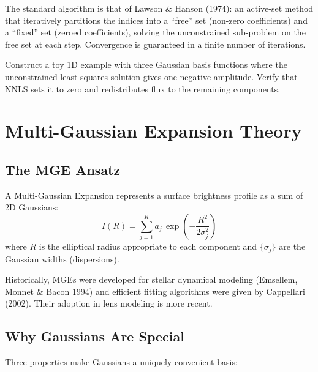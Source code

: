 \documentclass[11pt, letterpaper]{article}
\begin{document}
The standard algorithm is that of Lawson \& Hanson (1974): an active-set
method that iteratively partitions the indices into a ``free'' set
(non-zero coefficients) and a ``fixed'' set (zeroed coefficients),
solving the unconstrained sub-problem on the free set at each step.
Convergence is guaranteed in a finite number of iterations.

\begin{exercisebox}
Construct a toy 1D example with three Gaussian basis functions where
the unconstrained least-squares solution gives one negative amplitude.
Verify that NNLS sets it to zero and redistributes flux to the
remaining components.
\end{exercisebox}

\section{Multi-Gaussian Expansion Theory}
\label{sec:mge-theory}

\subsection{The MGE Ansatz}

A Multi-Gaussian Expansion represents a surface brightness profile as a
sum of 2D Gaussians:
\begin{equation}
  I(R) = \sum_{j=1}^{K} a_j \,
  \exp\!\left(-\frac{R^2}{2\sigma_j^2}\right)
  \label{eq:mge-ansatz}
\end{equation}
where $R$ is the elliptical radius appropriate to each component and
$\{\sigma_j\}$ are the Gaussian widths (dispersions).

Historically, MGEs were developed for stellar dynamical modeling
(Emsellem, Monnet \& Bacon 1994) and efficient fitting algorithms were
given by Cappellari (2002).  Their adoption in lens modeling is more
recent.

\subsection{Why Gaussians Are Special}

Three properties make Gaussians a uniquely convenient basis:
\end{document}
